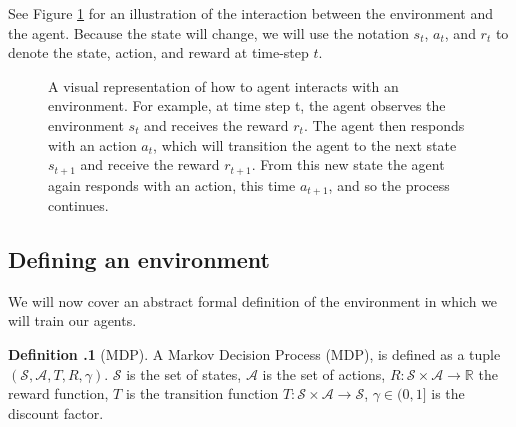 \documentclass[12pt,A4]{report}
\theoremstyle{definition}
\newtheorem{definition}{Definition}[section]
\begin{document}
See Figure \ref{fig:RL} for an illustration of the interaction between the environment and the agent. Because the state will change, we will use the notation $s_t$, $a_t$, and $r_t$ to denote the state, action, and reward at time-step $t$.


\begin{figure}[H]
  
  \caption{A visual representation of how to agent interacts with an environment. For example, at time step t, the agent observes the environment $s_t$ and receives the reward $r_t$. The agent then responds with an action $a_t$, which will transition the agent to the next state $s_{t+1}$ and receive the reward $r_{t+1}$. From this new state the agent again responds with an action, this time $a_{t+1}$, and so the process continues. } 
  \label{fig:RL}
\end{figure} 
 

\subsection{Defining an environment}
We will now cover an abstract formal definition of the environment in which we will train our agents.


\begin{displayquote}
  \textbf{Definition \thesection.1} (MDP).
  A Markov Decision Process (MDP), is defined as a tuple $(\mathcal{S}, \mathcal{A}, T, R, \gamma)$. $\mathcal{S}$ is the set of states, $\mathcal{A}$ is the set of actions, $R: \mathcal{S} \times \mathcal{A} \rightarrow \mathbb{R}$ the reward function, $T$ is the transition function $T: \mathcal{S} \times \mathcal{A} \rightarrow \mathcal{S}$, $\gamma \in (0, 1]$ is the discount factor.
\end{displayquote}
\end{document}
